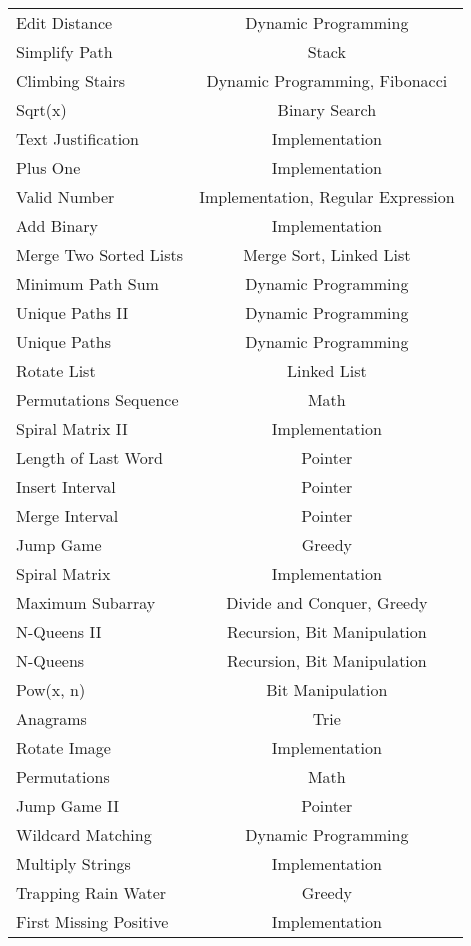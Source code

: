 \documentclass[paper=a4, fontsize=11pt]{scrartcl} %
\begin{document}
\begin{center}
\begin{longtable}{|l|c|}
    Edit Distance   &   Dynamic Programming \\
    Simplify Path   &   Stack   \\
    Climbing Stairs &   Dynamic Programming, Fibonacci  \\
    Sqrt(x) &   Binary Search   \\
    Text Justification  &   Implementation  \\
    Plus One    &   Implementation  \\
    Valid Number    &   Implementation, Regular Expression   \\
    Add Binary  &   Implementation  \\
    Merge Two Sorted Lists  &   Merge Sort, Linked List \\
    Minimum Path Sum  & Dynamic Programming \\
    Unique Paths II & Dynamic Programming  \\
    Unique Paths & Dynamic Programming  \\
    Rotate List & Linked List \\
    Permutations Sequence & Math  \\
    Spiral Matrix II  & Implementation  \\
    Length of Last Word & Pointer \\
    Insert Interval & Pointer \\
    Merge Interval  & Pointer \\
    Jump Game & Greedy  \\
    Spiral Matrix & Implementation  \\
    Maximum Subarray    &   Divide and Conquer, Greedy  \\
    N-Queens II    &   Recursion, Bit Manipulation \\
    N-Queens    &   Recursion, Bit Manipulation \\
    Pow(x, n)   &   Bit Manipulation    \\
    Anagrams    &   Trie    \\
    Rotate Image    &   Implementation  \\
    Permutations    &   Math    \\
    Jump Game II    &   Pointer\\
    Wildcard Matching   &   Dynamic Programming \\
    Multiply Strings    &   Implementation  \\
    Trapping Rain Water     &   Greedy  \\
    First Missing Positive  &   Implementation  \\

\end{longtable}
\end{center}
\end{document}
